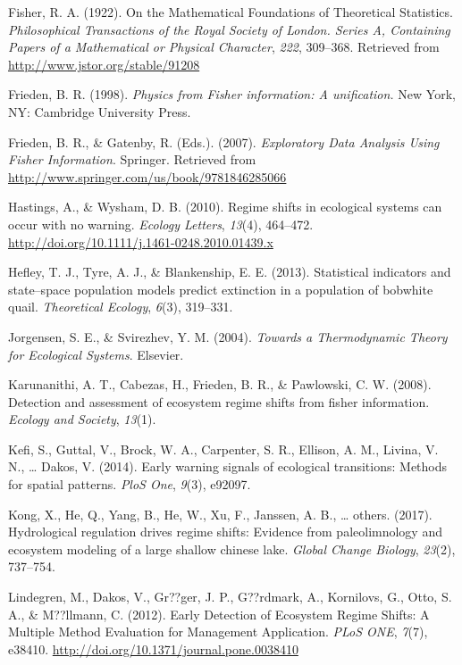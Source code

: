 \documentclass[12pt,twoside,openany]{reedthesis}
\begin{document}
\hypertarget{ref-fisher_mathematical_1922}{}
Fisher, R. A. (1922). On the Mathematical Foundations of Theoretical
Statistics. \emph{Philosophical Transactions of the Royal Society of
London. Series A, Containing Papers of a Mathematical or Physical
Character}, \emph{222}, 309--368. Retrieved from
\url{http://www.jstor.org/stable/91208}

\hypertarget{ref-frieden_physics_1998}{}
Frieden, B. R. (1998). \emph{Physics from Fisher information: A
unification.} New York, NY: Cambridge University Press.

\hypertarget{ref-frieden_exploratory_2007}{}
Frieden, B. R., \& Gatenby, R. (Eds.). (2007). \emph{Exploratory Data
Analysis Using Fisher Information}. Springer. Retrieved from
\url{http://www.springer.com/us/book/9781846285066}

\hypertarget{ref-hastings_regime_2010}{}
Hastings, A., \& Wysham, D. B. (2010). Regime shifts in ecological
systems can occur with no warning. \emph{Ecology Letters}, \emph{13}(4),
464--472. \url{http://doi.org/10.1111/j.1461-0248.2010.01439.x}

\hypertarget{ref-hefley2013statistical}{}
Hefley, T. J., Tyre, A. J., \& Blankenship, E. E. (2013). Statistical
indicators and state--space population models predict extinction in a
population of bobwhite quail. \emph{Theoretical Ecology}, \emph{6}(3),
319--331.

\hypertarget{ref-jorgensen_towards_2004}{}
Jorgensen, S. E., \& Svirezhev, Y. M. (2004). \emph{Towards a
Thermodynamic Theory for Ecological Systems}. Elsevier.

\hypertarget{ref-karunanithi_detection_2008}{}
Karunanithi, A. T., Cabezas, H., Frieden, B. R., \& Pawlowski, C. W.
(2008). Detection and assessment of ecosystem regime shifts from fisher
information. \emph{Ecology and Society}, \emph{13}(1).

\hypertarget{ref-kefi2014early}{}
Kefi, S., Guttal, V., Brock, W. A., Carpenter, S. R., Ellison, A. M.,
Livina, V. N., \ldots{} Dakos, V. (2014). Early warning signals of
ecological transitions: Methods for spatial patterns. \emph{PloS One},
\emph{9}(3), e92097.

\hypertarget{ref-kong2017hydrological}{}
Kong, X., He, Q., Yang, B., He, W., Xu, F., Janssen, A. B., \ldots{}
others. (2017). Hydrological regulation drives regime shifts: Evidence
from paleolimnology and ecosystem modeling of a large shallow chinese
lake. \emph{Global Change Biology}, \emph{23}(2), 737--754.

\hypertarget{ref-lindegren_early_2012}{}
Lindegren, M., Dakos, V., Gr??ger, J. P., G??rdmark, A., Kornilovs, G.,
Otto, S. A., \& M??llmann, C. (2012). Early Detection of Ecosystem
Regime Shifts: A Multiple Method Evaluation for Management Application.
\emph{PLoS ONE}, \emph{7}(7), e38410.
\url{http://doi.org/10.1371/journal.pone.0038410}
\end{document}
